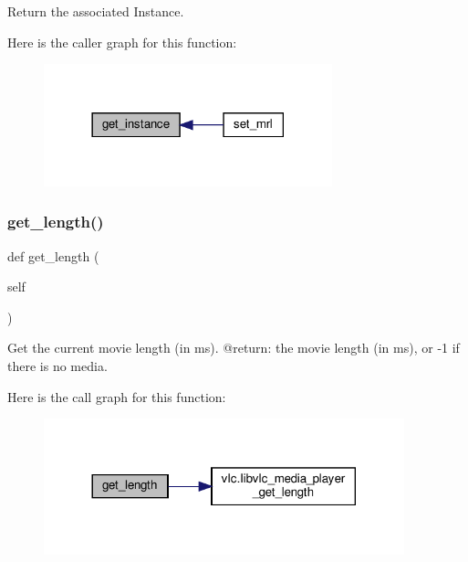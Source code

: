 \begin{DoxyVerb}Return the associated Instance.
\end{DoxyVerb}
 Here is the caller graph for this function\+:
\nopagebreak
\begin{figure}[H]
\begin{center}
\leavevmode
\includegraphics[width=237pt]{classvlc_1_1_media_player_a56c15bafa43c856366863fc07fc4021f_icgraph}
\end{center}
\end{figure}
\mbox{\label{classvlc_1_1_media_player_acbd51aed7cd34182d1489390bf607caf}} 
\subsubsection{\texorpdfstring{get\+\_\+length()}{get\_length()}}
{\footnotesize\ttfamily def get\+\_\+length (\begin{DoxyParamCaption}\item[{}]{self }\end{DoxyParamCaption})}

\begin{DoxyVerb}Get the current movie length (in ms).
@return: the movie length (in ms), or -1 if there is no media.
\end{DoxyVerb}
 Here is the call graph for this function\+:
\nopagebreak
\begin{figure}[H]
\begin{center}
\leavevmode
\includegraphics[width=296pt]{classvlc_1_1_media_player_acbd51aed7cd34182d1489390bf607caf_cgraph}
\end{center}
\end{figure}
\mbox{\label{classvlc_1_1_media_player_a1fa2f551dca8d895dc9639984cfb819b}} 

